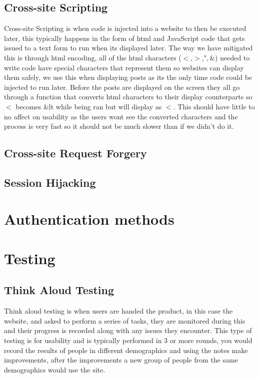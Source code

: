 \documentclass{cmpstyle}
\begin{document}
\subsection{Cross-site Scripting}
Cross-site Scripting is when code is injected into a website to then be executed later, this typically happens in the form of html and JavaScript code that gets issued to a text form to run when its displayed later. The way we have mitigated this is through html encoding, all of the html characters ($<$,$>$,",\,\&) needed to write code have special characters that represent them so websites can display them safely, we use this when displaying posts as its the only time code could be injected to run later. Before the posts are displayed on the screen they all go through a function that converts html characters to their display counterparts so $<$ becomes \&lt while being ran but will display as $<$. This should have little to no affect on usability as the users wont see the converted characters and the process is very fast so it should not be much slower than if we didn't do it.
\subsection{Cross-site Request Forgery}
\subsection{Session Hijacking}
\section{Authentication methods}	
	
\section{Testing}
\subsection{Think Aloud Testing}
Think aloud testing is when users are handed the product, in this case the website, and asked to perform a series of tasks, they are monitored during this and their progress is recorded along with any issues they encounter. This type of testing is for usability and is typically performed in 3 or more rounds, you would record the results of people in different demographics and using the notes make improvements, after the improvements a new group of people from the same demographics would use the site.
\end{document}
